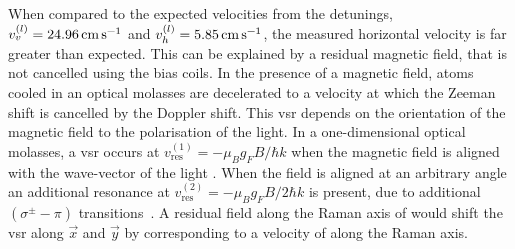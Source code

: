 \par\noindent
When compared to the expected velocities from the detunings, \(v^{(l)}_v = \sivalue{24.96}{\centi\metre\per\second}\) and  \(v^{(l)}_h = \sivalue{5.85}{\centi\metre\per\second}\), the measured horizontal velocity is far greater than expected. This can be explained by a residual magnetic field, that is not cancelled using the bias coils. In the presence of a magnetic field, atoms cooled in an optical molasses are decelerated to a velocity at which the Zeeman shift is cancelled by the Doppler shift. This \ac{vsr} depends on the orientation of the magnetic field to the polarisation of the light. In a one-dimensional optical molasses, a {vsr} occurs at \(v_\text{res}^{(1)} = - \mu_B g_F B/\hbar k\) when the magnetic field is aligned with the wave-vector of the light \cite{VanderStraten1993}. When the field is aligned at an arbitrary angle an additional resonance at \(v_\text{res}^{(2)} = - \mu_B g_F B/2\hbar k\) is present, due to additional \(\left(\sigma^{\pm}-\pi\right)\) transitions~\cite{Chang2002}. A residual field along the Raman axis of  would shift the \ac{vsr} along \(\vec{x}\) and \(\vec{y}\) by  corresponding to a velocity of  along the Raman axis. 

